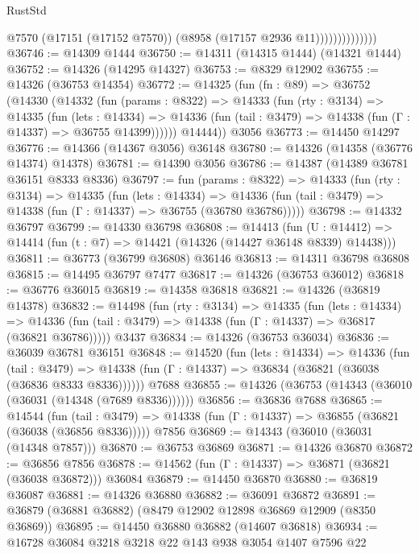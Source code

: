 \begin{lexlean}{RustStd}
\begin{coremodule}
                            @7570
                            (@17151 (@17152 @7570))
                            (@8958 (@17157 @2936 @11))))))))))))))
@36746 := @14309 @1444
@36750 := @14311 (@14315 @1444) (@14321 @1444)
@36752 := @14326 (@14295 @14327)
@36753 := @8329 @12902
@36755 := @14326 (@36753 @14354)
@36772 := @14325
    (fun (fn : @89) =>
    @36752
      (@14330
        (@14332
          (fun (params : @8322) =>
          @14333
            (fun (rty : @3134) =>
            @14335
              (fun (lets : @14334) =>
              @14336 (fun (tail : @3479) => @14338 (fun (Γ : @14337) => @36755 @14399))))))
        @14444))
    @3056
@36773 := @14450 @14297
@36776 := @14366 (@14367 @3056) @36148
@36780 := @14326 (@14358 (@36776 @14374) @14378)
@36781 := @14390 @3056
@36786 := @14387 (@14389 @36781 @36151 @8333 @8336)
@36797 := fun (params : @8322) =>
  @14333
    (fun (rty : @3134) =>
    @14335
      (fun (lets : @14334) =>
      @14336 (fun (tail : @3479) => @14338 (fun (Γ : @14337) => @36755 (@36780 @36786)))))
@36798 := @14332 @36797
@36799 := @14330 @36798
@36808 := @14413
    (fun (U : @14412) => @14414 (fun (t : @7) => @14421 (@14326 (@14427 @36148 @8339) @14438)))
@36811 := @36773 (@36799 @36808) @36146
@36813 := @14311 @36798 @36808
@36815 := @14495 @36797 @7477
@36817 := @14326 (@36753 @36012)
@36818 := @36776 @36015
@36819 := @14358 @36818
@36821 := @14326 (@36819 @14378)
@36832 := @14498
    (fun (rty : @3134) =>
    @14335
      (fun (lets : @14334) =>
      @14336 (fun (tail : @3479) => @14338 (fun (Γ : @14337) => @36817 (@36821 @36786)))))
    @3437
@36834 := @14326 (@36753 @36034)
@36836 := @36039 @36781 @36151
@36848 := @14520
    (fun (lets : @14334) =>
    @14336
      (fun (tail : @3479) =>
      @14338 (fun (Γ : @14337) => @36834 (@36821 (@36038 (@36836 @8333 @8336))))))
    @7688
@36855 := @14326 (@36753 (@14343 (@36010 (@36031 (@14348 (@7689 @8336))))))
@36856 := @36836 @7688
@36865 := @14544
    (fun (tail : @3479) => @14338 (fun (Γ : @14337) => @36855 (@36821 (@36038 (@36856 @8336)))))
    @7856
@36869 := @14343 (@36010 (@36031 (@14348 @7857)))
@36870 := @36753 @36869
@36871 := @14326 @36870
@36872 := @36856 @7856
@36878 := @14562 (fun (Γ : @14337) => @36871 (@36821 (@36038 @36872))) @36084
@36879 := @14450 @36870
@36880 := @36819 @36087
@36881 := @14326 @36880
@36882 := @36091 @36872
@36891 := @36879 (@36881 @36882) (@8479 @12902 @12898 @36869 @12909 (@8350 @36869))
@36895 := @14450 @36880 @36882 (@14607 @36818)
@36934 := @16728
    @36084
    @3218
    @3218
    @22
    @143
    @938
    @3054
    @1407
    @7596
    @22

\end{coremodule}
\end{lexlean}
